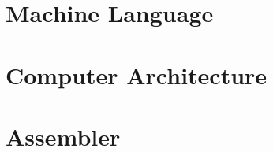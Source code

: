 \documentclass[11pt]{article}
\begin{document}
    \hypertarget{machine-language}{%
\section{Machine Language}\label{machine-language}}

    \hypertarget{computer-architecture}{%
\section{Computer Architecture}\label{computer-architecture}}

    \hypertarget{assembler}{%
\section{Assembler}\label{assembler}}


    
    
    
    
\end{document}
